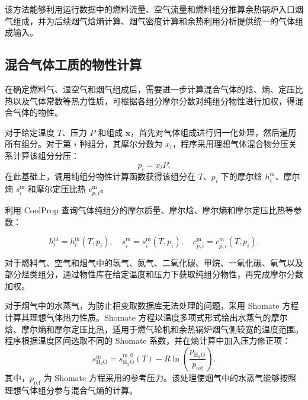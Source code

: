 该方法能够利用运行数据中的燃料流量、空气流量和燃料组分推算余热锅炉入口烟气组成，并为后续烟气焓熵计算、烟气密度计算和余热利用分析提供统一的气体组成输入。

\subsection{混合气体工质的物性计算}

在确定燃料气、湿空气和烟气组成后，需要进一步计算混合气体的焓、熵、定压比热以及气体常数等热力性质，可根据各组分摩尔分数对纯组分物性进行加权，得混合气体的物性。

对于给定温度 \(T\)、压力 \(P\) 和组成 \(\boldsymbol{x}\)，首先对气体组成进行归一化处理，然后遍历所有组分。对于第 \(i\) 种组分，其摩尔分数为 \(x_i\)，程序采用理想气体混合物分压关系计算该组分分压：
\begin{equation}\label{eq:partial-pressure}
p_i = x_i P .
\end{equation}
在此基础上，调用纯组分物性计算函数获得该组分在 \(T\)、\(p_i\) 下的摩尔焓 \(h_i^{\mathrm{m}}\)、摩尔熵 \(s_i^{\mathrm{m}}\) 和摩尔定压比热 \(c_{p,i}^{\mathrm{m}}\)。

利用 CoolProp 查询气体纯组分的摩尔质量、摩尔焓、摩尔熵和摩尔定压比热等参数：

\begin{equation}\label{eq:pure-component-props}
h_i^{\mathrm{m}} = h_i^{\mathrm{m}}(T,p_i),\quad
s_i^{\mathrm{m}} = s_i^{\mathrm{m}}(T,p_i),\quad
c_{p,i}^{\mathrm{m}} = c_{p,i}^{\mathrm{m}}(T,p_i).
\end{equation}

对于燃料气、空气和烟气中的氢气、氮气、二氧化碳、甲烷、一氧化碳、氧气以及部分烃类组分，通过物性库在给定温度和压力下获取纯组分物性，再完成摩尔分数加权。

对于烟气中的水蒸气，为防止相变取数据库无法处理的问题，采用 Shomate 方程计算其理想气体热力性质。Shomate 方程以温度多项式形式给出水蒸气的摩尔焓、摩尔熵和摩尔定压比热，适用于燃气轮机和余热锅炉烟气侧较宽的温度范围。程序根据温度区间选取不同的 Shomate 系数，并在熵计算中加入压力修正项：
\begin{equation}\label{eq:shomate-entropy}
s_{\mathrm{H_2O}}^{\mathrm{m}}
=
s_{\mathrm{H_2O}}^{\mathrm{m},0}(T)
-
R\ln\left(\frac{p_{\mathrm{H_2O}}}{p_{\mathrm{ref}}}\right).
\end{equation}
其中，\(p_{\mathrm{ref}}\) 为 Shomate 方程采用的参考压力。该处理使烟气中的水蒸气能够按照理想气体组分参与混合气熵的计算。

